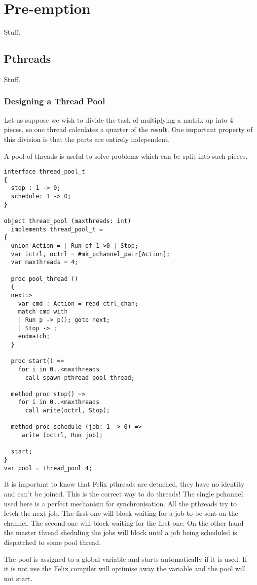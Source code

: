 \documentclass[oneside]{book}
\begin{document}
\chapter{Pre-emption}
Stuff.
\section{Pthreads}
Stuff.
\subsection{Designing a Thread Pool}
Let us suppose we wish to divide the task of multiplying
a matrix up into 4 pieces, so one thread calculates
a quarter of the result. One important property of this 
division is that the parts are entirely independent.

A pool of threads is useful to solve problems which can
be split into such pieces.

\begin{verbatim}
interface thread_pool_t
{
  stop : 1 -> 0;
  schedule: 1 -> 0;
}

object thread_pool (maxthreads: int) 
  implements thread_pool_t =
{
  union Action = | Run of 1->0 | Stop;
  var ictrl, octrl = #mk_pchannel_pair[Action];
  var maxthreads = 4;

  proc pool_thread ()
  {
  next:>
    var cmd : Action = read ctrl_chan;
    match cmd with
    | Run p -> p(); goto next;
    | Stop -> ;
    endmatch;
  }

  proc start() =>
    for i in 0..<maxthreads
      call spawn_pthread pool_thread;

  method proc stop() =>
    for i in 0..<maxthreads
      call write(octrl, Stop);

  method proc schedule (job: 1 -> 0) =>
     write (octrl, Run job);

  start;
}
var pool = thread_pool 4;
\end{verbatim}

It is important to know that Felix pthreads are detached,
they have no identity and can't be joined. This is the correct
way to do threads! The single pchannel used here is a perfect
mechanism for synchronisation. All the pthreads try to fetch
the next job. The first one will block waiting for a job to
be sent on the channel. The second one will block waiting
for the first one. On the other hand the master thread sheduling
the jobs will block until a job being scheduled is dispatched
to some pool thread.

The pool is assigned to a global variable and starts automatically
if it is used. If it is not use the Felix compiler will optimise
away the variable and the pool will not start.
\end{document}
